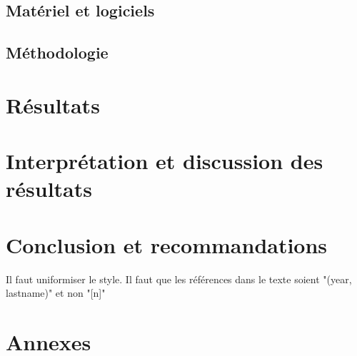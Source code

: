 \documentclass[12pt, letterpaper]{article}
\begin{document}
\subsection{Matériel et logiciels}

\subsection{Méthodologie}

\section{Résultats}

\section{Interprétation et discussion des résultats}

\section{Conclusion et recommandations}

\clearpage 
\newpage
{
   \color{red}
   \par Il faut uniformiser le style. Il faut que les références dans le texte soient "(year, lastname)" et non "[n]"
}
\printbibliography[title={\bibname\label{bib:references}}] 
\clearpage 
\newpage
\section{Annexes}

\end{document}
